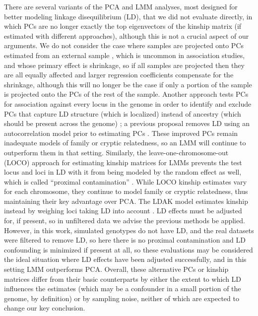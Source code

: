 \documentclass[11pt]{article}
\begin{document}
\begin{linenumbers}
There are several variants of the PCA and LMM analyses, most designed for better modeling linkage disequilibrium (LD), that we did not evaluate directly, in which PCs are no longer exactly the top eigenvectors of the kinship matrix (if estimated with different approaches), although this is not a crucial aspect of our arguments.
We do not consider the case where samples are projected onto PCs estimated from an external sample \citep{prive_efficient_2020}, which is uncommon in association studies, and whose primary effect is shrinkage, so if all samples are projected then they are all equally affected and larger regression coefficients compensate for the shrinkage, although this will no longer be the case if only a portion of the sample is projected onto the PCs of the rest of the sample.
Another approach tests PCs for association against every locus in the genome in order to identify and exclude PCs that capture LD structure (which is localized) instead of ancestry (which should be present across the genome) \citep{prive_efficient_2020}; a previous proposal removes LD using an autocorrelation model prior to estimating PCs \citep{patterson_population_2006}.
These improved PCs remain inadequate models of family or cryptic relatedness, so an LMM will continue to outperform them in that setting.
Similarly, the leave-one-chromosome-out (LOCO) approach for estimating kinship matrices for LMMs prevents the test locus and loci in LD with it from being modeled by the random effect as well, which is called ``proximal contamination'' \citep{lippert_fast_2011, yang_advantages_2014}.
While LOCO kinship estimates vary for each chromosome, they continue to model family or cryptic relatedness, thus maintaining their key advantage over PCA.
The LDAK model estimates kinship instead by weighing loci taking LD into account \citep{speed_improved_2012}.
LD effects must be adjusted for, if present, so in unfiltered data we advise the previous methods be applied.
However, in this work, simulated genotypes do not have LD, and the real datasets were filtered to remove LD, so here there is no proximal contamination and LD confounding is minimized if present at all, so these evaluations may be considered the ideal situation where LD effects have been adjusted successfully, and in this setting LMM outperforms PCA.
Overall, these alternative PCs or kinship matrices differ from their basic counterparts by either the extent to which LD influences the estimates (which may be a confounder in a small portion of the genome, by definition) or by sampling noise, neither of which are expected to change our key conclusion.


\end{linenumbers}
\end{document}

